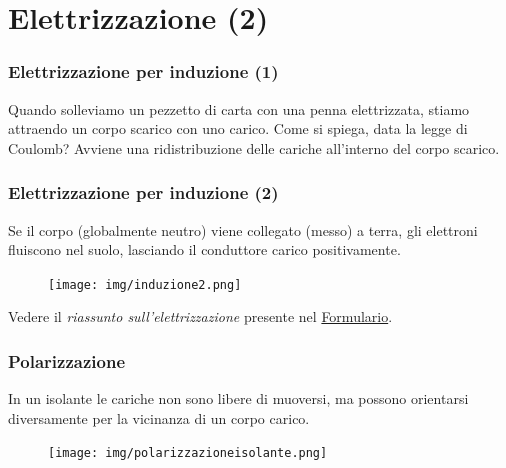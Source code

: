 \documentclass[]{beamer}
\theoremstyle{plain}
\begin{document}
\section{Elettrizzazione (2)}


\begin{frame}
\frametitle{Elettrizzazione per induzione (1)}
Quando solleviamo un pezzetto di carta con una penna elettrizzata, stiamo attraendo un corpo scarico con uno carico. Come si spiega, data la legge di Coulomb?\pause
{}
Avviene una \alert{ridistribuzione delle cariche} all'interno del corpo scarico.

\end{frame}

\begin{frame}
\frametitle{Elettrizzazione per induzione (2)}
Se il corpo (globalmente neutro) viene collegato (messo) a terra, gli elettroni fluiscono nel suolo, lasciando il conduttore carico positivamente.
\begin{figure}
\texttt{[image: img/induzione2.png]}
\end{figure}
Vedere il \emph{riassunto sull'elettrizzazione} presente nel \underline{Formulario}.
\end{frame}



\begin{frame}
\frametitle{Polarizzazione}
In un isolante le cariche non sono libere di muoversi, ma possono orientarsi diversamente per la vicinanza di un corpo carico.
\begin{figure}
\texttt{[image: img/polarizzazioneisolante.png]}
\end{figure}
\end{frame}
\end{document}
